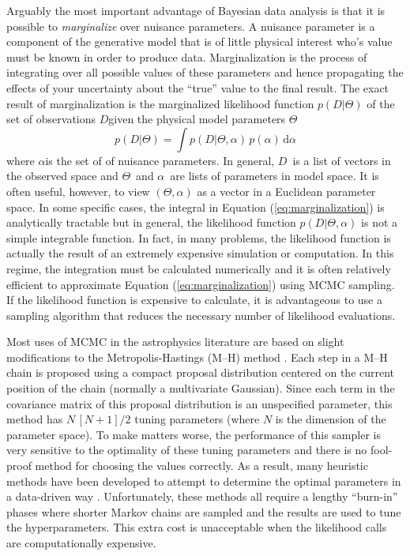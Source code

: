 \documentclass[12pt,preprint]{aastex}
\newcommand{\eq}[1]{Equation (\ref{eq:#1})}
\newcommand{\eqlabel}[1]{\label{eq:#1}}
\newcommand{\dd}{\mathrm{d}}
\renewcommand{\vector}[1]{#1}
\newcommand{\pr}[1]{\ensuremath{p(#1)}}
\newcommand{\model}{\ensuremath{\vector{\Theta}}}
\newcommand{\data}{\ensuremath{\vector{D}}}
\newcommand{\nuisance}{\ensuremath{\vector{\alpha}}}
\begin{document}
Arguably the most important advantage of Bayesian data analysis is
that it is possible to \emph{marginalize} over nuisance parameters. A
nuisance parameter is a component of the generative model that is of little
physical interest who's value must be known in order to produce data.
Marginalization is the process of integrating over all possible values of
these parameters and hence propagating the effects of your uncertainty about
the ``true'' value to the final result. The exact result of marginalization
is the marginalized likelihood function \pr{\data|\model}
of the set of observations \data given the physical model parameters
\model
\begin{equation}
    \eqlabel{marginalization}
    \pr{\data | \model} = \int
        \pr{\data | \model, \nuisance} \,
        \pr{\nuisance} \, \dd  \nuisance
\end{equation}
where \nuisance is the set of of nuisance parameters. In general, \data\ is
a list of vectors in the observed space and \model\ and \nuisance\ are lists
of parameters in model space. It is often useful, however, to view
$(\model, \nuisance)$ as a vector in a Euclidean parameter space.
In some specific
cases, the integral in \eq{marginalization} is analytically tractable but in
general, the likelihood function
$p (\data | \model, \nuisance)$ is not a simple
integrable function. In fact, in many problems, the likelihood
function is actually the result of an extremely expensive simulation or
computation. In this regime, the integration must be calculated numerically
and it is often relatively efficient to approximate \eq{marginalization}
using MCMC sampling. If the likelihood function is expensive to
calculate, it is advantageous to use a sampling algorithm that reduces the
necessary number of likelihood evaluations.

Most uses of MCMC in the astrophysics literature are based on slight
modifications to the Metropolis-Hastings (M--H) method
\citep[for example][]{MacKay:2003}. Each step in a M--H chain is proposed
using a compact proposal distribution centered on the current position of the
chain (normally a multivariate Gaussian). Since
each term in the covariance matrix of this proposal distribution is an
unspecified parameter, this method has $N\,[N+1]/2$ tuning parameters (where
$N$ is the dimension of the parameter space).  To make matters worse, the
performance of this sampler is very sensitive to the optimality of these
tuning parameters and there is no fool-proof method for choosing the values
correctly. As a result, many heuristic methods have been developed to attempt
to determine the optimal parameters in a data-driven way
\citep[for example][]{Gregory:2005,Dunkley:2005,Widrow:2008}. Unfortunately,
these methods all require a lengthy ``burn-in'' phases where shorter Markov
chains are sampled and the results are used to tune the hyperparameters. This
extra cost is unacceptable when the likelihood calls are computationally
expensive.
\end{document}
